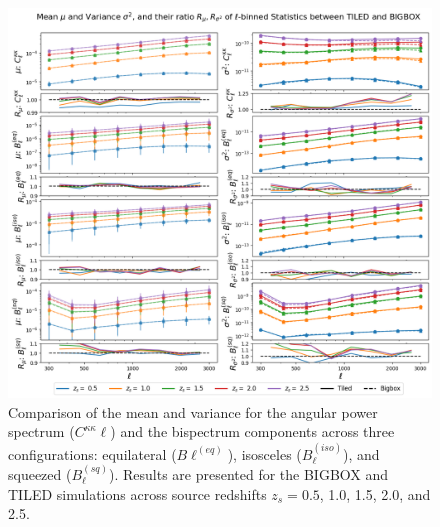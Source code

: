 \begin{figure}[ht]
    \centering
    \includegraphics[width=\textwidth]{figures/results/ell_main.png}
    \caption[Comparison of Mean and Variance for $C^{\kappa\kappa}_{\ell}$ and Bispectrum]
    {Comparison of the mean and variance for the angular power spectrum ($C^{\kappa\kappa}{\ell}$) and the bispectrum components across three configurations: equilateral ($B{\ell}^{(eq)}$), isosceles ($B_{\ell}^{(iso)}$), and squeezed ($B_{\ell}^{(sq)}$). Results are presented for the BIGBOX and TILED simulations across source redshifts $z_s = 0.5$, 1.0, 1.5, 2.0, and 2.5.}
    \label{fig:ell_main}
\end{figure}

